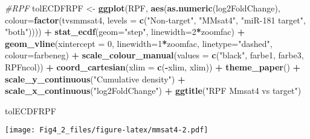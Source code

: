 \documentclass[
]{article}
\newenvironment{Shaded}{\begin{snugshade}}{\end{snugshade}}
\newcommand{\AttributeTok}[1]{\textcolor[rgb]{0.13,0.29,0.53}{#1}}
\newcommand{\CommentTok}[1]{\textcolor[rgb]{0.56,0.35,0.01}{\textit{#1}}}
\newcommand{\DecValTok}[1]{\textcolor[rgb]{0.00,0.00,0.81}{#1}}
\newcommand{\FunctionTok}[1]{\textcolor[rgb]{0.13,0.29,0.53}{\textbf{#1}}}
\newcommand{\NormalTok}[1]{#1}
\newcommand{\OtherTok}[1]{\textcolor[rgb]{0.56,0.35,0.01}{#1}}
\newcommand{\SpecialCharTok}[1]{\textcolor[rgb]{0.81,0.36,0.00}{\textbf{#1}}}
\newcommand{\StringTok}[1]{\textcolor[rgb]{0.31,0.60,0.02}{#1}}
\begin{document}
\begin{Shaded}
\begin{Highlighting}[]
\CommentTok{\#RPF}
\NormalTok{tolECDFRPF }\OtherTok{\textless{}{-}} \FunctionTok{ggplot}\NormalTok{(RPF, }\FunctionTok{aes}\NormalTok{(}\FunctionTok{as.numeric}\NormalTok{(log2FoldChange), }\AttributeTok{colour=}\FunctionTok{factor}\NormalTok{(tvsmmsat4, }\AttributeTok{levels =} \FunctionTok{c}\NormalTok{(}\StringTok{"Non{-}target"}\NormalTok{, }\StringTok{"MMsat4"}\NormalTok{, }\StringTok{"miR{-}181 target"}\NormalTok{, }\StringTok{"both"}\NormalTok{)))) }\SpecialCharTok{+} 
  \FunctionTok{stat\_ecdf}\NormalTok{(}\AttributeTok{geom=}\StringTok{"step"}\NormalTok{, }\AttributeTok{linewidth=}\DecValTok{2}\SpecialCharTok{*}\NormalTok{zoomfac) }\SpecialCharTok{+}
  \FunctionTok{geom\_vline}\NormalTok{(}\AttributeTok{xintercept =} \DecValTok{0}\NormalTok{, }\AttributeTok{linewidth=}\DecValTok{1}\SpecialCharTok{*}\NormalTok{zoomfac, }\AttributeTok{linetype=}\StringTok{"dashed"}\NormalTok{, }\AttributeTok{colour=}\NormalTok{farbeneg) }\SpecialCharTok{+}
  \FunctionTok{scale\_colour\_manual}\NormalTok{(}\AttributeTok{values =} \FunctionTok{c}\NormalTok{(}\StringTok{"black"}\NormalTok{, farbe1, farbe3, RPFncol)) }\SpecialCharTok{+}
  \FunctionTok{coord\_cartesian}\NormalTok{(}\AttributeTok{xlim =} \FunctionTok{c}\NormalTok{(}\SpecialCharTok{{-}}\NormalTok{xlim, xlim)) }\SpecialCharTok{+} 
  \FunctionTok{theme\_paper}\NormalTok{() }\SpecialCharTok{+}
  \FunctionTok{scale\_y\_continuous}\NormalTok{(}\StringTok{"Cumulative density"}\NormalTok{) }\SpecialCharTok{+} \FunctionTok{scale\_x\_continuous}\NormalTok{(}\StringTok{"log2FoldChange"}\NormalTok{) }\SpecialCharTok{+}
  \FunctionTok{ggtitle}\NormalTok{(}\StringTok{"RPF Mmsat4 vs target"}\NormalTok{)}

\NormalTok{tolECDFRPF}
\end{Highlighting}
\end{Shaded}

\texttt{[image: Fig4\_2\_files/figure-latex/mmsat4-2.pdf]}
\end{document}
